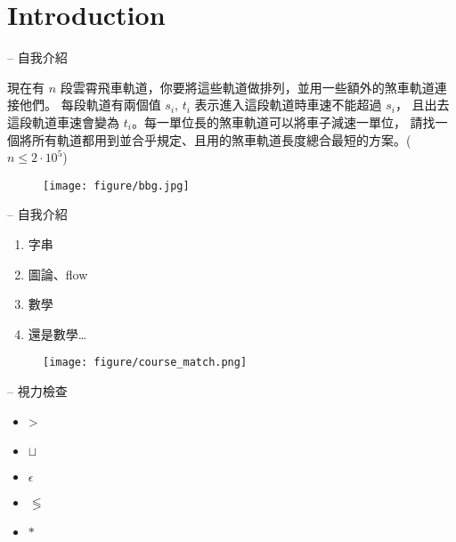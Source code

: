 \documentclass[standalone]{beamer}
\begin{document}
\section{Introduction}

\begin{frame}{{\secname} -- 自我介紹}
\begin{problem}
  \small
  現在有 $n$ 段雲霄飛車軌道，你要將這些軌道做排列，並用一些額外的煞車軌道連接他們。
  每段軌道有兩個值 $s_i$, $t_i$ 表示進入這段軌道時車速不能超過 $s_i$，
  且出去這段軌道車速會變為 $t_i$。每一單位長的煞車軌道可以將車子減速一單位，
  請找一個將所有軌道都用到並合乎規定、且用的煞車軌道長度總合最短的方案。($n \leq 2 \cdot 10^5$)
\end{problem}
\pause \disskip
\begin{figure}
\texttt{[image: figure/bbg.jpg]}%
\end{figure}
\end{frame}

\begin{frame}{{\secname} -- 自我介紹}
  \begin{enumerate}[<+->]
    \item 字串
    \item 圖論、flow
    \item 數學
    \item 還是數學…
  \end{enumerate}

  \onslide<+->
  \begin{figure}
    \texttt{[image: figure/course\_match.png]}%
  \end{figure}
\end{frame}

\begin{frame}{{\secname} -- 視力檢查}
  \pause
  \begin{itemize}
    \item<+-> {\fontsize{60pt}{100pt}\selectfont >} \\[20pt]
    \item<+-> {\Huge $\sqcup$} \\[10pt]
    \item<+-> {\Large $\epsilon$} \\[10pt]
    \item<+-> {\Large $\lessgtr$} \\[10pt]
    \item<+-> {\Huge $\ast$}
  \end{itemize}
\end{frame}
\end{document}
